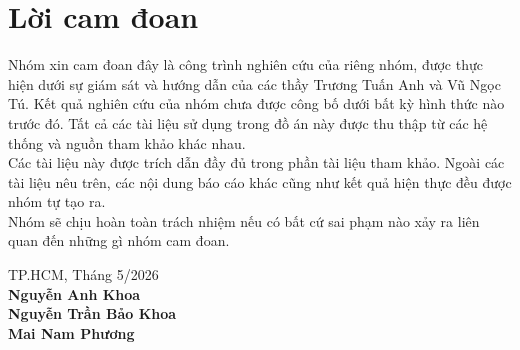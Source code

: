 \section*{Lời cam đoan}
\thispagestyle{empty}

Nhóm xin cam đoan đây là công trình nghiên cứu của riêng nhóm, được thực hiện dưới sự giám sát và hướng dẫn của các thầy Trương Tuấn Anh và Vũ Ngọc Tú. Kết quả nghiên cứu của nhóm chưa được công bố dưới bất kỳ hình thức nào trước đó. Tất cả các tài liệu sử dụng trong đồ án này được thu thập từ các hệ thống và nguồn tham khảo khác nhau.\\
Các tài liệu này được trích dẫn đầy đủ trong phần tài liệu tham khảo. Ngoài các tài liệu nêu trên, các nội dung báo cáo khác cũng như kết quả hiện thực đều được nhóm tự tạo ra.\\
Nhóm sẽ chịu hoàn toàn trách nhiệm nếu có bất cứ sai phạm nào xảy ra liên quan đến những gì nhóm cam đoan. \\

\begin{flushright}
TP.HCM, Tháng 5/2026 \\ 
\textbf{Nguyễn Anh Khoa} \\
\textbf{Nguyễn Trần Bảo Khoa} \\ 
\textbf{Mai Nam Phương} \\ 
\end{flushright}


\clearpage
{}
